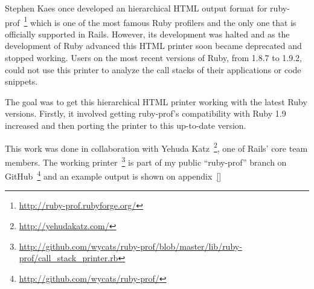 Stephen Kaes once developed an hierarchical HTML output format for ruby-prof~\footnote{\url{http://ruby-prof.rubyforge.org/}} which is one of the most famous Ruby profilers and the only one that is officially supported in Rails. However, its development was halted and as the development of Ruby advanced this HTML printer soon became deprecated and stopped working. Users on the most recent versions of Ruby, from 1.8.7 to 1.9.2, could not use this printer to analyze the call stacks of their applications or code snippets.

The goal was to get this hierarchical HTML printer working with the latest Ruby versions. Firstly, it involved getting ruby-prof's compatibility with Ruby 1.9 increased and then porting the printer to this up-to-date version.

This work was done in collaboration with Yehuda Katz~\footnote{\url{http://yehudakatz.com/}}, one of Rails' core team members. The working printer~\footnote{\url{http://github.com/wycats/ruby-prof/blob/master/lib/ruby-prof/call_stack_printer.rb}} is part of my public ``ruby-prof'' branch on GitHub~\footnote{\url{http://github.com/wycats/ruby-prof/}} and an example output is shown on appendix~\ref{}

\begin{comment}
Port escolinhas to 1.9

Add GC configurability

Add the ability to store and retrieve profiling information from ruby

Ported a graphical profiling tool that enables call stacks w/ time
\end{comment}
